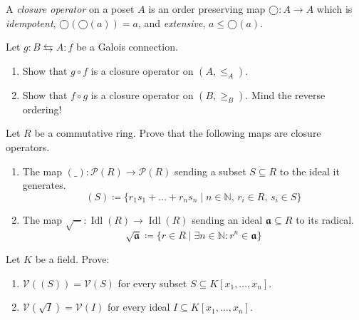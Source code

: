 \documentclass{uebungsblatt}
\DeclareMathOperator{\Idl}{Idl}
\begin{document}
\begin{exercise}
  A \emph{closure operator} on a poset $A$ is an order preserving map $◯:A → A$ which is \emph{idempotent}, $◯(◯(a)) = a$, and \emph{extensive}, $a ≤ ◯(a)$.

  Let $g:B ⇆ A:f$ be a Galois connection.
  \begin{enumerate}
    \item Show that $g∘f$ is a closure operator on $(A,≤_A)$.
    \item Show that $f∘g$ is a closure operator on $(B,≥_B)$.
      {\scriptsize Mind the reverse ordering!}
  \end{enumerate}
  Let $R$ be a commutative ring.
  Prove that the following maps are closure operators.
  \begin{enumerate}[start=3]
    \item The map $(\_):𝒫(R) → 𝒫(R)$ sending a subset $S⊆R$ to the ideal it generates. 
      $$
      (S)\coloneqq \{r_1s_1 + \dots + r_ns_n \mid n ∈ ℕ,\, r_i ∈ R,\, s_i ∈ S\}
      $$
    \item The map $\sqrt{-}:\Idl(R) → \Idl(R)$ sending an ideal $𝖆⊆R$ to its radical.
      $$
      \sqrt{𝖆}\coloneqq\{r ∈ R \mid ∃n ∈ ℕ : r^n ∈ 𝖆\}
      $$
  \end{enumerate}
  Let $K$ be a field.
  Prove:
  \begin{enumerate}[start=5]
    \item $𝒱((S))=𝒱(S)$ for every subset $S⊆K[x_1,\dots,x_n]$.
    \item $𝒱(\sqrt{I})=𝒱(I)$ for every ideal $I⊆K[x_1,\dots,x_n]$.
  \end{enumerate}
\end{exercise}
\end{document}
